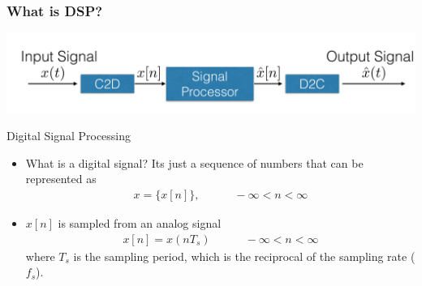 \documentclass[mathserif,9pt,handout]{beamer}
\begin{document}
\begin{frame}\frametitle{What is DSP?}\small
  \begin{center}
    \includegraphics[width=.9\textwidth]{dsp_flow_sampled.pdf}
  \end{center}
  \begin{block}{\small Digital Signal Processing}
  \begin{itemize}
    \item What is a digital signal? Its just a sequence of numbers that can be represented as 
      \begin{align}
         x = \{x[n]\}, \hspace{3em} -\infty < n <  \infty \nonumber
      \end{align}
    \item $x[n]$ is sampled from an analog signal
      \begin{align}
         x[n] = x(nT_s) \hspace{3em} -\infty < n <  \infty \nonumber
      \end{align}
      where $T_s$ is the sampling period, which is the reciprocal of the sampling rate ($f_s$). 
  \end{itemize}
  \end{block}
\end{frame}
\end{document}
